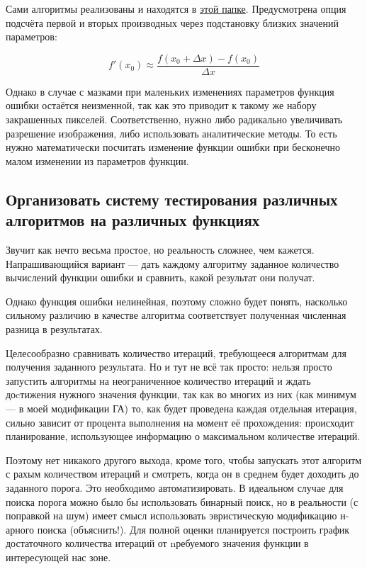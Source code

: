 Сами алгоритмы реализованы и находятся в \href{https://github.com/donRumata03/PowerfulGA/blob/master/other_optimization/local_optimization.cpp}{этой папке}.
Предусмотрена опция подсчёта первой и вторых производных через подстановку близких значений параметров:

\begin{equation}
    f'(x_0) \approx \frac{f(x_0 + \Delta x) - f(x_0)}{\Delta x}
\end{equation}

Однако в случае с мазками при маленьких изменениях параметров функция ошибки остаётся неизменной, так как это приводит к такому же набору закрашенных пикселей.
Соответственно, нужно либо радикально увеличивать разрешение изображения, либо использовать аналитические методы.
То есть нужно математически посчитать изменение функции ошибки при бесконечно малом изменении из параметров функции.

 \subsection{Организовать систему тестирования различных алгоритмов на различных функциях}\label{itm:testing_system}
Звучит как нечто весьма простое, но реальность сложнее, чем кажется.
Напрашивающийся вариант — дать каждому алгоритму заданное количество вычислений функции ошибки и сравнить, какой результат они получат.

Однако функция ошибки нелинейная, поэтому сложно будет понять,
насколько сильному различию в качестве алгоритма соответствует полученная численная разница в результатах.

Целесообразно сравнивать количество итераций, требующееся алгоритмам для получения заданного результата.
Но и тут не всё так просто: нельзя просто запустить алгоритмы на неограниченное количество итераций
и ждать доcтижения нужного значения функции,
так как во многих из них (как минимум — в моей модификации ГА) то,
как будет проведена каждая отдельная итерация, сильно зависит от процента выполнения на момент её прохождения:
происходит планирование,  использующее информацию о максимальном количестве итераций.


Поэтому нет никакого другого выхода, кроме того, чтобы запускать этот алгоритм с рахым количеством итераций и смотреть, когда он в среднем будет доходить до заданного порога.
Это необходимо автоматизировать.
В идеальном случае для поиска порога можно было бы использовать бинарный поиск, но в реальности (с поправкой на шум) имеет смысл использовать эвристическую модификацию н-арного поиска (объяснить!).
Для полной оценки планируется построить график достаточного количества итераций от nребуемого значения функции в интересующей нас зоне.

